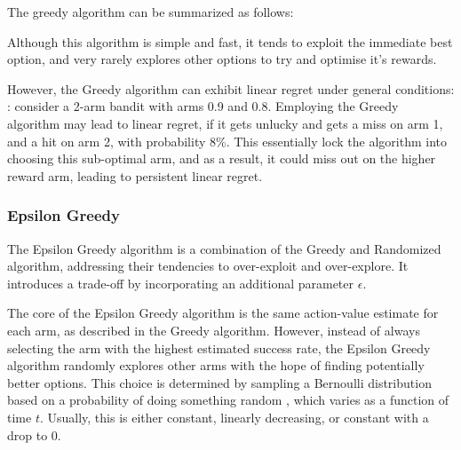 The greedy algorithm can be summarized as follows:


Although this algorithm is simple and fast, it tends to exploit the immediate best option, and very rarely explores other options to try and optimise it's rewards.

However, the Greedy algorithm can exhibit linear regret under general conditions: : consider a 2-arm bandit with arms 0.9 and 0.8. Employing the Greedy algorithm may lead to linear regret, if it gets unlucky and gets a miss on arm 1, and a hit on arm 2, with probability 8\%. This essentially lock the algorithm into choosing this sub-optimal arm, and as a result, it could miss out on the higher reward arm, leading to persistent linear regret.

\subsubsection{Epsilon Greedy}
\label{sec:EpsilonGreedy}
The Epsilon Greedy algorithm is a combination of the Greedy and Randomized algorithm, addressing their tendencies to over-exploit and over-explore. It introduces a trade-off by incorporating an additional parameter $\epsilon$.

The core of the Epsilon Greedy algorithm is the same action-value estimate for each arm, as described in the Greedy algorithm. However, instead of always selecting the arm with the highest estimated success rate, the Epsilon Greedy algorithm randomly explores other arms with the hope of finding potentially better options. This choice is determined by sampling a Bernoulli distribution based on a probability of doing something random \epsilonFunction, which varies as a function of time $t$. Usually, this is either constant, linearly decreasing, or constant with a drop to 0.


